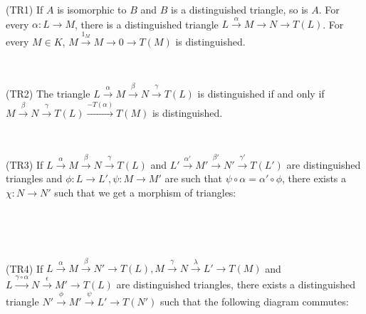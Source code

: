 \documentclass[12pt]{amsart}    %
\theoremstyle{definition}
\begin{document}
(TR1) If $A$ is isomorphic to $B$ and $B$ is a distinguished triangle, so is $A$.  For every $\alpha: L \rightarrow M$, there is a distinguished triangle $L \xrightarrow{\alpha} M \rightarrow N \rightarrow T(L)$.  For every $M \in K$, $M \xrightarrow{1_M} M \rightarrow 0 \rightarrow T(M)$ is distinguished.

\

(TR2) The triangle $L \xrightarrow{\alpha} M \xrightarrow{\beta} N \xrightarrow{\gamma} T(L)$ is distinguished if and only if $M \xrightarrow{\beta} N \xrightarrow{\gamma} T(L) \xrightarrow{-T(\alpha)} T(M)$ is distinguished.

\

(TR3) If $L \xrightarrow{\alpha} M \xrightarrow{\beta} N \xrightarrow{\gamma} T(L)$ and $L' \xrightarrow{\alpha'} M' \xrightarrow{\beta'} N' \xrightarrow{\gamma'} T(L')$ are distinguished triangles and $\phi: L \rightarrow L', \psi: M \rightarrow M'$ are such that $\psi \circ \alpha = \alpha' \circ \phi$, there exists a $\chi: N \rightarrow N'$ such that we get a morphism of triangles:  

\

\begin{center}
\end{center}

\

(TR4) If $L \xrightarrow{\alpha} M \xrightarrow{\beta} N' \rightarrow T(L), M \xrightarrow{\gamma} N \xrightarrow{\lambda} L' \rightarrow T(M)$ and $L \xrightarrow{\gamma \circ \alpha} N \xrightarrow{\epsilon} M' \rightarrow T(L)$ are distinguished triangles, there exists a distinguished triangle $N' \xrightarrow{\phi} M' \xrightarrow{\psi} L' \rightarrow T(N')$ such that the following diagram commutes:
\end{document}
